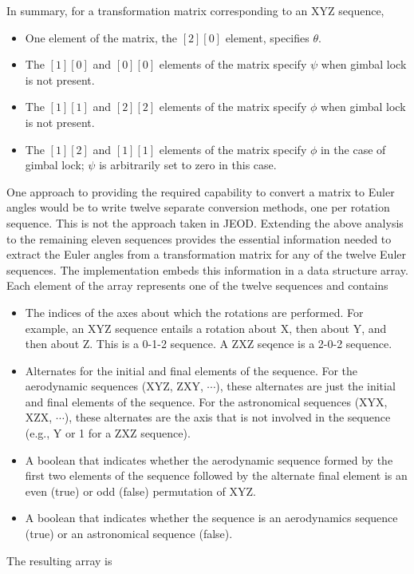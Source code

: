 In summary, for a transformation matrix corresponding to an XYZ sequence,
\begin{itemize}
\item One element of the matrix, the $[2][0]$ element, specifies $\theta$.
\item The $[1][0]$ and $[0][0]$ elements of the matrix specify $\psi$
   when gimbal lock is not present.
\item The $[1][1]$ and $[2][2]$ elements of the matrix specify $\phi$
   when gimbal lock is not present.
\item The $[1][2]$ and $[1][1]$ elements of the matrix specify $\phi$
   in the case of gimbal lock; $\psi$ is arbitrarily set to zero in this case.
\end{itemize}

One approach to providing the required capability to convert a matrix
to Euler angles would be to write twelve separate conversion methods,
one per rotation sequence. This is not the approach taken in JEOD.
Extending the above analysis to the remaining eleven sequences provides the
essential information needed to extract the Euler angles from a transformation
matrix for any of the twelve Euler sequences. The implementation embeds this
information in a data structure array. Each element of the array
represents one of the twelve sequences and contains
\begin{itemize}
\item The indices of the axes about which the rotations are performed.
  For example, an XYZ sequence entails a rotation about X, then about Y,
  and then about Z. This is a 0-1-2 sequence. A ZXZ seqence is a 2-0-2 sequence.
\item Alternates for the initial and final elements of the sequence.
  For the aerodynamic sequences (XYZ, ZXY, $\cdots$), these alternates
  are just the initial and final elements of the sequence. For the
  astronomical sequences (XYX, XZX, $\cdots$), these alternates are the
  axis that is not involved in the sequence (e.g., Y or 1 for a ZXZ sequence).
\item A boolean that indicates whether the aerodynamic sequence formed by the
  first two elements of the sequence followed by the alternate final element is
  an even (true) or odd (false) permutation of XYZ.
\item A boolean that indicates whether the sequence is an aerodynamics sequence
  (true) or an astronomical sequence (false).
\end{itemize}
The resulting array is
